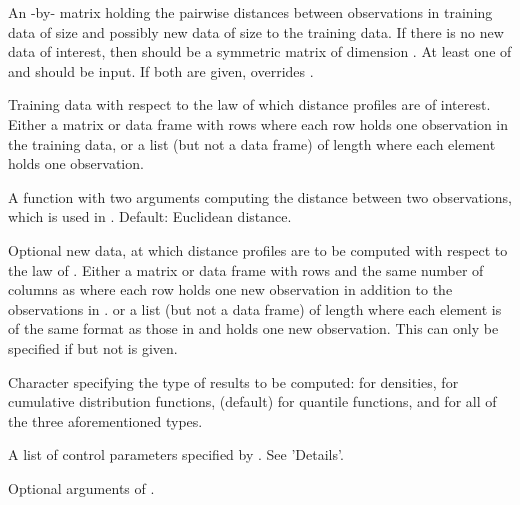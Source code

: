 \documentclass[a4paper]{book}
\begin{document}
\begin{Arguments}
\begin{ldescription}
\item[\code{distmat}] An -by- matrix holding the pairwise distances between observations 
in training data of size  and possibly new data of size  to the training data.
If there is no new data of interest, then  should be a symmetric matrix of dimension . 
At least one of  and  should be input. 
If both are given,  overrides .

\item[\code{data}] Training data with respect to the law of which distance profiles are of interest. 
Either a matrix or data frame with  rows where each row holds one observation 
in the training data, or a list (but not a data frame) of length  where each element holds one observation.

\item[\code{distfun}] A function with two arguments computing the distance between two observations, 
which is used in . Default: Euclidean distance.

\item[\code{newdata}] Optional new data, at which distance profiles are to be computed 
with respect to the law of . 
Either a matrix or data frame with  rows and the same number of columns as  
where each row holds one new observation in addition to the observations in . 
or a list (but not a data frame) of length  where each element is of the same format as those in  
and holds one new observation. 
This can only be specified if  but not  is given.

\item[\code{type}] Character specifying the type of results to be computed:
 for densities,
 for cumulative distribution functions,
 (default) for quantile functions,
and  for all of the three aforementioned types.

\item[\code{optns}] A list of control parameters specified by . See 'Details'.

\item[\code{...}] Optional arguments of .
\end{ldescription}
\end{Arguments}
\end{document}
